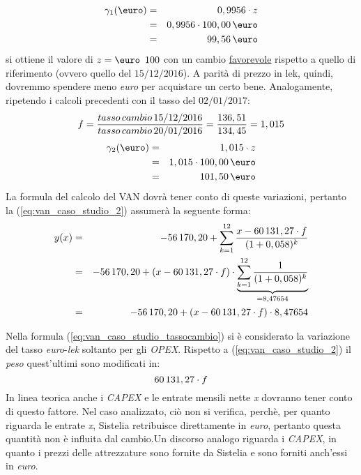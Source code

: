 \begin{eqnarray}
\label{eq:euro_example1}
	\gamma _1 (\mbox{\euro})& = & 0,9956 \cdot z 	\nonumber \\
			  & = & 0,9956 \cdot 100,00 \thinspace \mbox{\euro} \nonumber \\
			  & = & 99,56 \thinspace \mbox{\euro}
\end{eqnarray}
si ottiene il valore di $z = \mbox{\euro \thinspace 100}$ con un cambio \underline{favorevole} rispetto a quello di riferimento (ovvero quello del $15/12/2016$). A parità di prezzo in lek, quindi, dovremmo spendere meno \textit{euro} per acquistare un certo bene.\newline
Analogamente, ripetendo i calcoli precedenti con il tasso del $02/01/2017$:
\begin{equation}
\label{eq:example_2_fattore_aggiustamento}
\begin{split}
	f = \frac{tasso \thinspace cambio \thinspace 15/12/2016}{tasso \thinspace cambio \thinspace 20/01/2016} = \frac{136,51}{134,45} = 1,015
\end{split}
\end{equation}
\begin{eqnarray}
\label{eq:euro_example2}
	\gamma _2 (\mbox{\euro})& = & 1,015 \cdot z 	\nonumber \\
			  & = & 1,015 \cdot 100,00 \thinspace \mbox{\euro} \nonumber \\
			  & = & 101,50 \thinspace \mbox{\euro}
\end{eqnarray}
La formula del calcolo del VAN dovrà tener conto di queste variazioni, pertanto la (\ref{eq:van_caso_studio_2}) assumerà la seguente forma:
	\begin{eqnarray}
	\label{eq:van_caso_studio_tassocambio}
 		y(x) & = & - 56\thinspace 170,20 + \sum_{k=1}^{12} \frac{x - 60\thinspace 131,27 \cdot f}{(1+0,058)^k} \nonumber \\
 		 & = & -56\thinspace 170,20 + (x - 60\thinspace 131,27 \cdot f) \cdot \underbrace{\sum_{k=1}^{12} \frac{1} {(1+0,058)^{k}}}_{{}=8,47654} \nonumber \\
 		 & = & -56\thinspace 170,20 + (x - 60\thinspace 131,27 \cdot f) \cdot 8,47654		
	\end{eqnarray}  		

	\begin{tcolorbox}[colframe=blue!75!black,adjusted title=\textbf{Osservazione!}]
		Nella formula (\ref{eq:van_caso_studio_tassocambio}) si è considerato la variazione del tasso \emph{euro}-\emph{lek} soltanto per gli \emph{\ac{OPEX}}. \newline Rispetto a (\ref{eq:van_caso_studio_2}) il \emph{peso} quest'ultimi sono modificati in:
		\[ 60\thinspace 131,27 \cdot f \] 
	In linea teorica anche i \emph{\ac{CAPEX}} e le entrate mensili nette \emph{x} dovranno tener conto di questo fattore. Nel caso analizzato, ciò non si verifica, perchè, per quanto riguarda le entrate \emph{x}, Sistelia retribuisce direttamente in \emph{euro}, pertanto questa quantità non è influita dal cambio.\newline Un discorso analogo riguarda i \emph{\ac{CAPEX}}, in quanto i prezzi delle attrezzature sono fornite da Sistelia e sono forniti anch'essi in \emph{euro}.
	\end{tcolorbox} 
